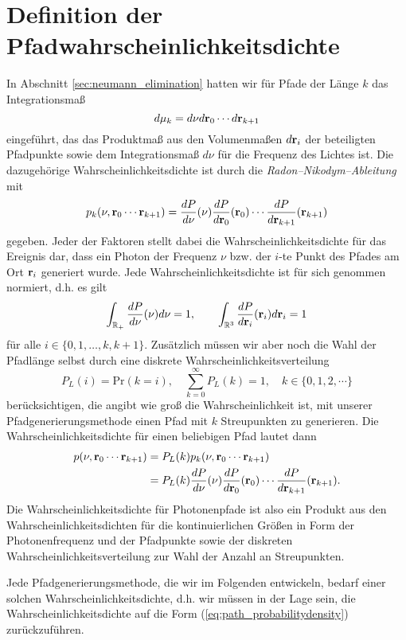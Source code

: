 	\section{Definition der Pfadwahrscheinlichkeitsdichte}
	In Abschnitt \ref{sec:neumann_elimination} hatten wir für Pfade der Länge $k$ das Integrationsmaß $$d\mu_k=d\nu d\mathbf{r}_0\cdots d\mathbf{r}_{k+1}$$ eingeführt, das das Produktmaß aus den Volumenmaßen $d\mathbf{r}_i$ der beteiligten Pfadpunkte sowie dem Integrationsmaß $d\nu$ für die Frequenz des Lichtes ist. Die dazugehörige Wahrscheinlichkeitsdichte ist durch die {\em Radon--Nikodym--Ableitung} mit
	$$p_k(\nu,\mathbf{r}_0\cdots \mathbf{r}_{k+1})=\frac{dP}{d\nu}(\nu)\frac{dP}{d\mathbf{r}_0}(\mathbf{r}_0)\cdots\frac{dP}{d\mathbf{r}_{k+1}}(\mathbf{r}_{k+1})$$
	gegeben. Jeder der Faktoren stellt dabei die Wahrscheinlichkeitsdichte für das Ereignis dar, dass ein Photon der Frequenz $\nu$ bzw. der $i$-te Punkt des Pfades am Ort $\mathbf{r}_i$ generiert wurde. Jede Wahrscheinlichkeitsdichte ist für sich genommen normiert, d.h. es gilt
	$$\int_{\mathbb{R}_+} \frac{dP}{d\nu}(\nu) d\nu=1,\qquad \int_{\mathbb{R}^3} \frac{dP}{d\mathbf{r}_i}(\mathbf{r}_i) d\mathbf{r}_i=1$$
	für alle $i\in\{0,1,\dots,k,k+1\}$. Zusätzlich müssen wir aber noch die Wahl der Pfadlänge selbst durch eine diskrete Wahrscheinlichkeitsverteilung
	$$P_L(i)=\text{Pr}(k=i),\quad\sum_{k=0}^\infty P_L(k)=1,\quad k\in\{0,1,2,\cdots\}$$ berücksichtigen, die angibt wie groß die Wahrscheinlichkeit ist, mit unserer Pfadgenerierungsmethode einen Pfad mit $k$ Streupunkten zu generieren. Die Wahrscheinlichkeitsdichte für einen beliebigen Pfad lautet dann
	\begin{align}
		p(\nu,\mathbf{r}_0\cdots \mathbf{r}_{k+1})&=P_L(k)p_k(\nu,\mathbf{r}_0\cdots \mathbf{r}_{k+1}) \nonumber\\
		&=P_L(k)\frac{dP}{d\nu}(\nu)\frac{dP}{d\mathbf{r}_0}(\mathbf{r}_0)\cdots\frac{dP}{d\mathbf{r}_{k+1}}(\mathbf{r}_{k+1}).
		\label{eq:path_probabilitydensity}
	\end{align}
	Die Wahrscheinlichkeitsdichte für Photonenpfade ist also ein Produkt aus den Wahrscheinlichkeitsdichten für die kontinuierlichen Größen in Form der Photonenfrequenz und der Pfadpunkte sowie der diskreten Wahrscheinlichkeitsverteilung zur Wahl der Anzahl an Streupunkten.
	
	Jede Pfadgenerierungsmethode, die wir im Folgenden entwickeln, bedarf einer solchen Wahrscheinlichkeitsdichte, d.h. wir müssen in der Lage sein, die Wahrscheinlichkeitsdichte auf die Form (\ref{eq:path_probabilitydensity}) zurückzuführen.
	
